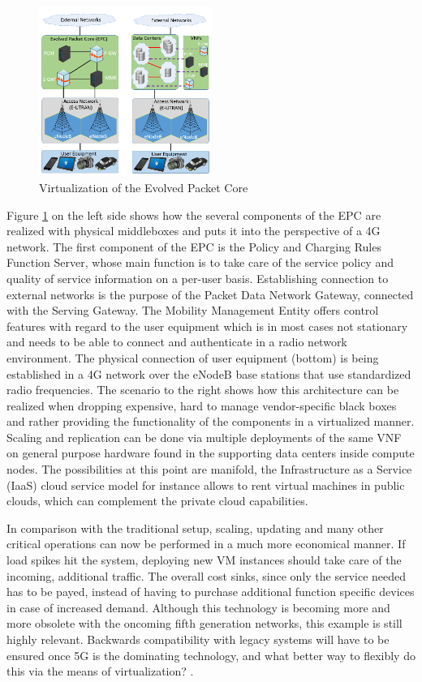 \begin{figure}[h]
	\centering
	\includegraphics[width=0.5\textwidth]{images/epc_virt.png}
	\caption{Virtualization of the Evolved Packet Core \cite{mijumbi2016network}}
	\label{img:epc_virt}
\end{figure}

Figure \ref{img:epc_virt} on the left side shows how the several components of the EPC are realized with physical middleboxes and puts it into the perspective of a 4G network. The first component of the EPC is the Policy and Charging Rules Function Server, whose main function is to take care of the service policy and quality of service information on a per-user basis. Establishing connection to external networks is the purpose of the Packet Data Network Gateway, connected with the Serving Gateway. The Mobility Management Entity offers control features with regard to the user equipment which is in most cases not stationary and needs to be able to connect and authenticate in a radio network environment. The physical connection of user equipment (bottom) is being established in a 4G network over the eNodeB base stations that use standardized radio frequencies.
The scenario to the right shows how this architecture can be realized when dropping expensive, hard to manage vendor-specific black boxes and rather providing the functionality of the components in a virtualized manner. Scaling and replication can be done via multiple deployments of the same VNF on general purpose hardware found in the supporting data centers inside compute nodes. The possibilities at this point are manifold, the Infrastructure as a Service (IaaS) cloud service model for instance allows to rent virtual machines in public clouds, which can complement the private cloud capabilities. 

In comparison with the traditional setup, scaling, updating and many other critical operations can now be performed in a much more economical manner. If load spikes hit the system, deploying new VM instances should take care of the incoming, additional traffic. The overall cost sinks, since only the service needed has to be payed, instead of having to purchase additional function specific devices in case of increased demand. Although this technology is becoming more and more obsolete with the oncoming fifth generation networks, this example is still highly relevant. Backwards compatibility with legacy systems will have to be ensured once 5G is the dominating technology, and what better way to flexibly do this via the means of virtualization? \cite{4g} \cite{mijumbi2016network}. 

